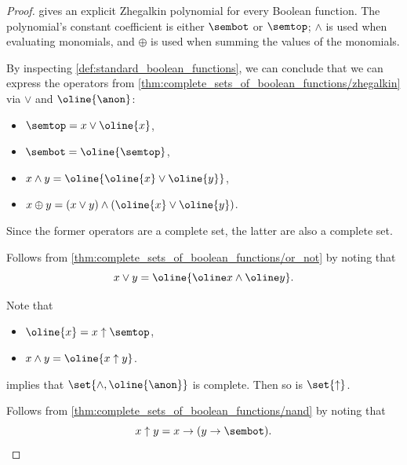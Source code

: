 \begin{proof}
    gives an explicit Zhegalkin polynomial for every Boolean function. The polynomial's constant coefficient is either \( \sembot \) or \( \semtop \); \( \wedge \) is used when evaluating monomials, and \( \oplus \) is used when summing the values of the monomials.

   By inspecting \cref{def:standard_boolean_functions}, we can conclude that we can express the operators from \cref{thm:complete_sets_of_boolean_functions/zhegalkin} via \( \vee \) and \( \oline{\anon} \):
  \begin{itemize}
    \item \( \semtop = x \vee \oline{x} \),
    \item \( \sembot = \oline{\semtop} \),
    \item \( x \wedge y = \oline{\oline{x} \vee \oline{y}} \),
    \item \( x \oplus y = (x \vee y) \wedge (\oline{x} \vee \oline{y}) \).
  \end{itemize}

  Since the former operators are a complete set, the latter are also a complete set.

   Follows from \cref{thm:complete_sets_of_boolean_functions/or_not} by noting that
  \begin{equation*}
    x \vee y = \oline{\oline x \wedge \oline y}.
  \end{equation*}

   Note that
  \begin{itemize}
    \item \( \oline{x} = x \uparrow \semtop \),
    \item \( x \wedge y = \oline{x \uparrow y} \).
  \end{itemize}

   implies that \( \set{ \wedge, \oline{\anon} } \) is complete. Then so is \( \set{ \uparrow } \).

   Follows from \cref{thm:complete_sets_of_boolean_functions/nand} by noting that
  \begin{equation*}
    x \uparrow y = x \rightarrow (y \rightarrow \sembot).
  \end{equation*}
\end{proof}
